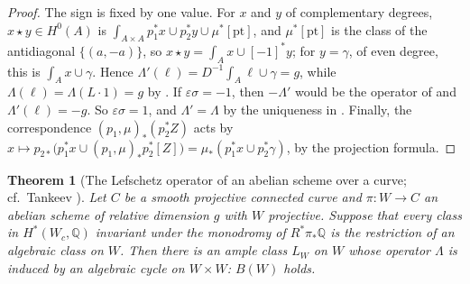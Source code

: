 \documentclass[11pt,reqno]{amsart}
\theoremstyle{plain}
\newtheorem{theorem}{Theorem}[section]
\theoremstyle{definition}
\theoremstyle{remark}
\newcommand{\QQ}{\mathbb{Q}}
\begin{document}
\begin{proof}
The sign is fixed by one value. For $x$ and $y$ of complementary degrees,
$x\star y\in H^{0}(A)$ is $\int_{A\times A}p_{1}^{*}x\cup p_{2}^{*}y\cup
\mu^{*}[\mathrm{pt}]$, and $\mu^{*}[\mathrm{pt}]$ is the class of the
antidiagonal $\{(a,-a)\}$, so $x\star y=\int_{A}x\cup[-1]^{*}y$; for
$y=\gamma$, of even degree, this is $\int_{A}x\cup\gamma$. Hence
$\Lambda'(\ell)=D^{-1}\int_{A}\ell\cup\gamma=g$, while
$\Lambda(\ell)=\Lambda(L\cdot1)=g$ by \cite[Lemma~10.7]{paperI}. If
$\varepsilon\sigma=-1$, then $-\Lambda'$ would be the operator of
\cite[Definition~10.6]{paperI} and $\Lambda'(\ell)=-g$. So $\varepsilon\sigma=1$, and
$\Lambda'=\Lambda$ by the uniqueness in \cite[Definition~10.6]{paperI}. Finally, the
correspondence $(p_{1},\mu)_{*}(p_{2}^{*}Z)$ acts by
$x\mapsto p_{2*}\bigl(p_{1}^{*}x\cup(p_{1},\mu)_{*}p_{2}^{*}[Z]\bigr)
=\mu_{*}(p_{1}^{*}x\cup p_{2}^{*}\gamma)$, by the projection formula.
\end{proof}

\begin{theorem}[The Lefschetz operator of an abelian scheme over a curve;
cf.\ Tankeev \cite{Tan03}]
\label{thm:lefschetzfamily}
Let $C$ be a smooth projective connected curve and $\pi\colon W\to C$ an
abelian scheme of relative dimension $g$ with $W$ projective. Suppose that
every class in $H^{*}(W_{c},\QQ)$ invariant under the monodromy of
$R^{*}\pi_{*}\QQ$ is the restriction of an algebraic class on $W$. Then there
is an ample class $L_{W}$ on $W$ whose operator $\Lambda$ is induced by an
algebraic cycle on $W\times W$: $B(W)$ holds.
\end{theorem}
\end{document}
